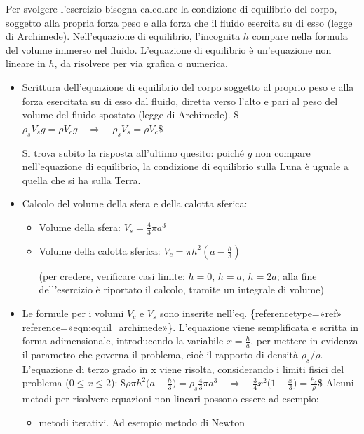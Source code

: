 \documentclass[letterpaper,10pt,italian]{jupyterBook}
\begin{document}
\sphinxAtStartPar
{} Per svolgere l’esercizio bisogna calcolare la condizione di equilibrio
del corpo, soggetto alla propria forza peso e alla forza che il fluido
esercita su di esso (legge di Archimede). Nell’equazione di equilibrio,
l’incognita \(h\) compare nella formula del volume immerso nel fluido.
L’equazione di equilibrio è un’equazione non lineare in \(h\), da
risolvere per via grafica o numerica.
\begin{itemize}
\item {} 
\sphinxAtStartPar
Scrittura dell’equazione di equilibrio del corpo soggetto al proprio
peso e alla forza esercitata su di esso dal fluido, diretta verso
l’alto e pari al peso del volume del fluido spostato (legge di
Archimede). \$\(\label{eqn:equil_archimede}
      \rho_s V_s g = \rho V_c g \quad\Rightarrow\quad \rho_s V_s = \rho V_c\)\$

\sphinxAtStartPar
{} Si trova subito la risposta all’ultimo quesito:
poiché \(g\) non compare nell’equazione di equilibrio, la condizione
di equilibrio sulla Luna è uguale a quella che si ha sulla Terra.

\item {} 
\sphinxAtStartPar
Calcolo del volume della sfera e della calotta sferica:
\begin{itemize}
\item {} 
\sphinxAtStartPar
Volume della sfera: \(V_s = \frac{4}{3}\pi a^3\)

\item {} 
\sphinxAtStartPar
Volume della calotta sferica: \(V_c = \pi h^2 (a - \frac{h}{3})\)

\sphinxAtStartPar
(per credere, verificare casi limite: \(h=0\), \(h=a\), \(h=2a\); alla
fine dell’esercizio è riportato il calcolo, tramite un integrale
di volume)

\end{itemize}

\item {} 
\sphinxAtStartPar
Le formule per i volumi \(V_c\) e \(V_s\) sono inserite nell’eq.
\{reference\sphinxhyphen{}type=»ref»
reference=»eqn:equil\_archimede»\}. L’equazione viene semplificata e
scritta in forma adimensionale, introducendo la variabile
\(x=\frac{h}{a}\), per mettere in evidenza il parametro che governa il
problema, cioè il rapporto di densità \(\rho_s/\rho\). L’equazione di
terzo grado in x viene risolta, considerando i limiti fisici del
problema (\(0 \le x \le 2\)):
\$\(\rho \pi h^2 \Big(a-\frac{h}{3}\Big) = \rho_s \frac{4}{3}\pi a^3  \quad\Rightarrow\quad
      \frac{3}{4} x^2 \Big(1 - \frac{x}{3}\Big) = \frac{\rho_s}{\rho}\)\$
Alcuni metodi per risolvere equazioni non lineari possono essere ad
esempio:
\begin{itemize}
\item {} 
\sphinxAtStartPar
metodi iterativi. Ad esempio metodo di Newton


\end{itemize}
\end{itemize}
\end{document}
